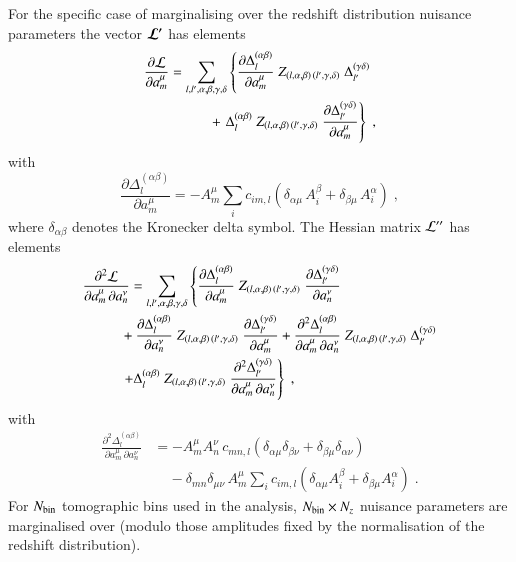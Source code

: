 \documentclass{aa}
\newcommand{\eq}[1]{\begin{equation}  #1 \end{equation}}
\newcommand{\eqa}[1]{\begin{align}   #1 \end{align}}
\newcommand{\br}[1]{\left( #1 \right)}
\newcommand{\nn}{\nonumber}
\begin{document}
For the specific case of marginalising over the redshift distribution nuisance parameters the vector $\boldsymbol{\cal L^\prime}$ has elements
\eqa{
\frac{\partial {\cal L}}{\partial a_m^\mu} &= \sum_{l,l',\alpha,\beta,\gamma,\delta}  \left\{ \frac{\partial \Delta_l^{(\alpha \beta)}}{\partial a_m^\mu}\; Z_{(l,\alpha,\beta) \,  (l',\gamma,\delta)}\; \Delta_{l'}^{(\gamma \delta)} \right. \\ \nn
& \hspace*{1cm} + \left. \Delta_l^{(\alpha \beta)}\; Z_{(l,\alpha,\beta) \,  (l',\gamma,\delta)}\; \frac{\partial \Delta_{l'}^{(\gamma \delta)}}{\partial a_m^\mu} \right\}\;,
}
with
\eq{
\frac{\partial \Delta_l^{(\alpha \beta)}}{\partial a_m^\mu} = - A_m^\mu \sum_i c_{im,l} \br{\delta_{\alpha \mu}\, A_i^\beta + \delta_{\beta \mu}\, A_i^\alpha}\;,
}
where $\delta_{\alpha \beta}$ denotes the Kronecker delta symbol. The Hessian matrix ${\cal L^{\prime\prime}}$ has elements
\eqa{
\label{eq:hessian}
\frac{\partial^2 {\cal L}}{\partial a_m^\mu\, \partial a_n^\nu} &= \sum_{l,l',\alpha,\beta,\gamma,\delta} 
\left\{ 
\frac{\partial \Delta_l^{(\alpha \beta)}}{\partial a_m^\mu}\; Z_{(l,\alpha,\beta) \,  (l',\gamma,\delta)}\; \frac{\partial \Delta_{l'}^{(\gamma \delta)}}{\partial a_n^\nu}  \right. \\ \nn
& \!\!\!\! + \frac{\partial \Delta_l^{(\alpha \beta)}}{\partial a_n^\nu}\; Z_{(l,\alpha,\beta) \,  (l',\gamma,\delta)}\; \frac{\partial \Delta_{l'}^{(\gamma \delta)}}{\partial a_m^\mu} 
+ \frac{\partial^2 \Delta_l^{(\alpha \beta)}}{\partial a_m^\mu\, \partial a_n^\nu}\; Z_{(l,\alpha,\beta) \,  (l',\gamma,\delta)}\; \Delta_{l'}^{(\gamma \delta)} \\ \nn
& \!\!\!\! \left. + \Delta_l^{(\alpha \beta)}\; Z_{(l,\alpha,\beta) \,  (l',\gamma,\delta)}\; \frac{\partial^2 \Delta_{l'}^{(\gamma \delta)}}{\partial a_m^\mu\, \partial a_n^\nu}
\right\}\;,
}
with 
\eqa{
\frac{\partial^2 \Delta_l^{(\alpha \beta)}}{\partial a_m^\mu\, \partial a_n^\nu} &= - A_m^\mu A_n^\nu \, c_{mn,l} \br{ \delta_{\alpha \mu} \delta_{\beta \nu} + \delta_{\beta \mu} \delta_{\alpha \nu} }\\ \nn
& ~~~~~ - \delta_{mn} \delta_{\mu \nu}\, A_m^\mu \sum_i c_{im,l} \br{\delta_{\alpha \mu} A_i^\beta + \delta_{\beta \mu} A_i^\alpha}\;.
}
For $N_{\rm bin}$ tomographic bins used in the analysis, $N_{\rm bin} \times N_z$ nuisance parameters are marginalised over (modulo those amplitudes fixed by the normalisation of the redshift distribution).


\end{document}
